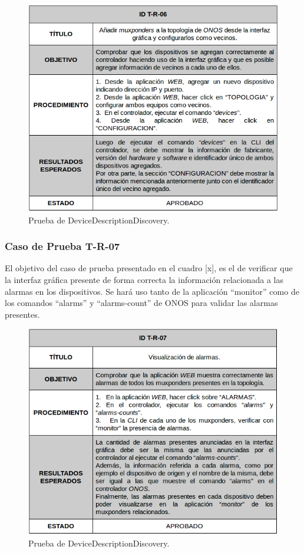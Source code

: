 \begin{figure}[H]
	\centering
	\includegraphics[scale=0.6]{Figures/test6.png}
	\caption{Prueba de DeviceDescriptionDiscovery.}
	\label{fig:test2}
  \end{figure}



  \subsubsection{Caso de Prueba T-R-07}

El objetivo del caso de prueba presentado en el cuadro [x], es el de verificar que la interfaz gráfica presente de forma correcta la información relacionada a las alarmas en los dispositivos. 
Se hará uso tanto de la aplicación “monitor” como de los comandos “alarms” y “alarms-count” de ONOS para validar las alarmas presentes.


\begin{figure}[H]
	\centering
	\includegraphics[scale=0.6]{Figures/test7.png}
	\caption{Prueba de DeviceDescriptionDiscovery.}
	\label{fig:test2}
  \end{figure}

